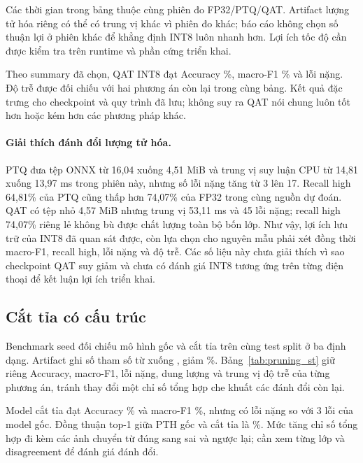 Các thời gian trong bảng thuộc cùng phiên đo FP32/PTQ/QAT. Artifact lượng tử hóa riêng có thể có trung vị khác vì phiên đo khác; báo cáo không chọn số thuận lợi ở phiên khác để khẳng định INT8 luôn nhanh hơn. Lợi ích tốc độ cần được kiểm tra trên runtime và phần cứng triển khai.

Theo summary đã chọn, QAT INT8 đạt Accuracy \QATAccuracy\%, macro-F1 \QATMacroFOne\% và \QATCriticalCount{} lỗi nặng. Độ trễ được đối chiếu với hai phương án còn lại trong cùng bảng. Kết quả đặc trưng cho checkpoint và quy trình đã lưu; không suy ra QAT nói chung luôn tốt hơn hoặc kém hơn các phương pháp khác.

\paragraph{Giải thích đánh đổi lượng tử hóa.} PTQ đưa tệp ONNX từ 16,04 xuống 4,51 MiB và trung vị suy luận CPU từ 14,81 xuống 13,97 ms trong phiên này, nhưng số lỗi nặng tăng từ 3 lên 17. Recall high 64,81\% của PTQ cũng thấp hơn 74,07\% của FP32 trong cùng nguồn dự đoán. QAT có tệp nhỏ 4,57 MiB nhưng trung vị 53,11 ms và 45 lỗi nặng; recall high 74,07\% riêng lẻ không bù được chất lượng toàn bộ bốn lớp. Như vậy, lợi ích lưu trữ của INT8 đã quan sát được, còn lựa chọn cho nguyên mẫu phải xét đồng thời macro-F1, recall high, lỗi nặng và độ trễ. Các số liệu này chưa giải thích vì sao checkpoint QAT suy giảm và chưa có đánh giá INT8 tương ứng trên từng điện thoại để kết luận lợi ích triển khai.

\subsection{Cắt tỉa có cấu trúc}



Benchmark seed \PruningSeed{} đối chiếu mô hình gốc và cắt tỉa trên cùng test split ở ba định dạng. Artifact ghi số tham số từ \PruningParametersBefore{} xuống \PruningParametersAfter{}, giảm \PruningParameterReduction\%. Bảng~\ref{tab:pruning_st} giữ riêng Accuracy, macro-F1, lỗi nặng, dung lượng và trung vị độ trễ của từng phương án, tránh thay đổi một chỉ số tổng hợp che khuất các đánh đổi còn lại.

Model cắt tỉa đạt Accuracy \PruningAccuracy\% và macro-F1 \PruningMacroFOne\%, nhưng có \PruningCriticalCount{} lỗi nặng so với 3 lỗi của model gốc. Đồng thuận top-1 giữa PTH gốc và cắt tỉa là \PruningAgreement\%. Mức tăng chỉ số tổng hợp đi kèm các ảnh chuyển từ đúng sang sai và ngược lại; cần xem từng lớp và disagreement để đánh giá đánh đổi.


